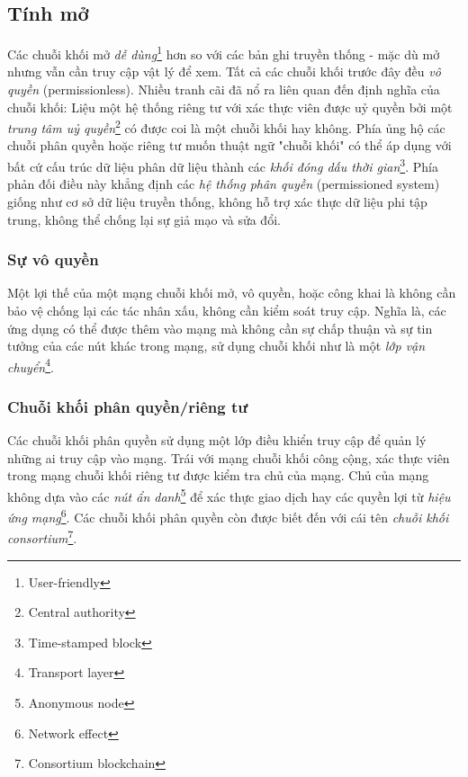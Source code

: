 \subsection{Tính mở}

Các chuỗi khối mở \textit{dễ dùng}\footnote{User-friendly} hơn so với các bản ghi truyền thống - mặc dù mở nhưng vẫn cần truy cập vật lý để xem. Tất cả các chuỗi khối trước đây đều \textit{vô quyền} (permissionless). Nhiều tranh cãi đã nổ ra liên quan đến định nghĩa của chuỗi khối: Liệu một hệ thống riêng tư với xác thực viên được uỷ quyền bởi một \textit{trung tâm uỷ quyền}\footnote{Central authority} có được coi là một chuỗi khối hay không. Phía ủng hộ các chuỗi phân quyền hoặc riêng tư muốn thuật ngữ "chuỗi khối" có thể áp dụng với bất cứ cấu trúc dữ liệu phân dữ liệu thành các \textit{khối đóng dấu thời gian}\footnote{Time-stamped block}. Phía phản đối điều này khẳng định các \textit{hệ thống phân quyền} (permissioned system) giống như cơ sở dữ liệu truyền thống, không hỗ trợ xác thực dữ liệu phi tập trung, không thể chống lại sự giả mạo và sửa đổi.

\subsubsection{Sự vô quyền}
Một lợi thế của một mạng chuỗi khối mở, vô quyền, hoặc công khai là không cần bảo vệ chống lại các tác nhân xấu, không cần kiểm soát truy cập. Nghĩa là, các ứng dụng có thể được thêm vào mạng mà không cần sự chấp thuận và sự tin tưởng của các nút khác trong mạng, sử dụng chuỗi khối như là một \textit{lớp vận chuyển}\footnote{Transport layer}.

\subsubsection{Chuỗi khối phân quyền/riêng tư}
Các chuỗi khối phân quyền sử dụng một lớp điều khiển truy cập để quản lý những ai truy cập vào mạng. Trái với mạng chuỗi khối công cộng, xác thực viên trong mạng chuỗi khối riêng tư được kiểm tra chủ của mạng. Chủ của mạng không dựa vào các \textit{nút ẩn danh}\footnote{Anonymous node} để xác thực giao dịch hay các quyền lợi từ \textit{hiệu ứng mạng}\footnote{Network effect}. Các chuỗi khối phân quyền còn được biết đến với cái tên \textit{chuỗi khối consortium}\footnote{Consortium blockchain}.